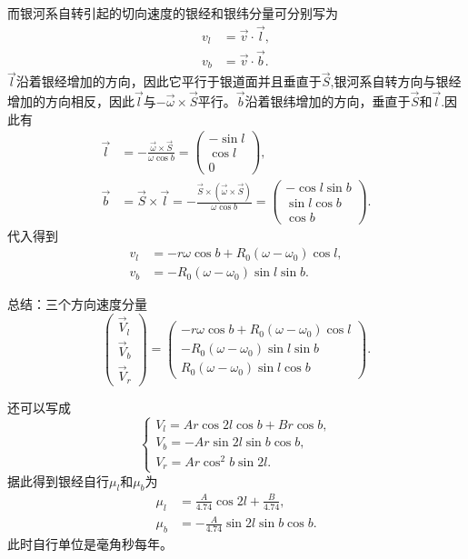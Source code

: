 \documentclass[11pt, a4paper, oneside]{ctexart}
\numberwithin{equation}{subsection}
\begin{document}
而银河系自转引起的切向速度的银经和银纬分量可分别写为
\begin{align}
v_l&=\vec v\cdot\vec l,\\
v_b&=\vec v\cdot\vec b.
\end{align}
$\vec l$沿着银经增加的方向，因此它平行于银道面并且垂直于$\vec S$,银河系自转方向与银经增加的方向相反，因此$\vec l$与$-\vec\omega\times\vec S$平行。$\vec b$沿着银纬增加的方向，垂直于$\vec S$和$\vec l$.因此有
\begin{align}
\vec l&=-\frac{\vec\omega\times\vec S}{\omega\cos b}=\begin{pmatrix}
-\sin l\\
\cos l\\
0
\end{pmatrix},\\
\vec b&=\vec S\times\vec l=-\frac{\vec S\times\left(\vec\omega\times\vec S\right)}{\omega\cos b}=\begin{pmatrix}
-\cos l\sin b\\
\sin l\cos b\\
\cos b
\end{pmatrix}.
\end{align}
代入得到
\begin{align}
v_l&=-r\omega\cos b+R_0\left(\omega-\omega_0\right)\cos l,\\
v_b&=-R_0\left(\omega-\omega_0\right)\sin l\sin b.
\end{align}

总结：三个方向速度分量
\begin{equation}
\begin{pmatrix}
\vec V_l\\
\vec V_b\\
\vec V_r
\end{pmatrix}=
\begin{pmatrix}
-r\omega\cos b+R_0\left(\omega-\omega_0\right)\cos l\\
-R_0\left(\omega-\omega_0\right)\sin l\sin b\\
R_0\left(\omega-\omega_0\right)\sin l\cos b
\end{pmatrix}.
\end{equation}

还可以写成
\begin{equation}
\begin{cases}
V_l=Ar\cos2l\cos b+Br\cos b,\\
V_b=-Ar\sin2l\sin b\cos b,\\
V_r=Ar\cos^2b\sin2l.
\end{cases}
\end{equation}
据此得到银经自行$\mu_l$和$\mu_b$为
\begin{align}
\mu_l&=\frac{A}{4.74}\cos 2l+\frac{B}{4.74},\\
\mu_b&=-\frac{A}{4.74}\sin2l\sin b\cos b.
\end{align}
此时自行单位是毫角秒每年。
\end{document}
